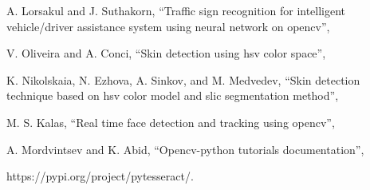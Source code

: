 \documentclass[uplatex, twocolumn,10pt]{jsarticle}
\begin{document}
\begin{thebibliography}{99}
    A. Lorsakul and J. Suthakorn,
    \newblock “Traffic sign recognition for intelligent vehicle/driver assistance system using neural network on opencv”,
    
    V. Oliveira and A. Conci,
    \newblock “Skin detection using hsv color space”,
    
    K. Nikolskaia, N. Ezhova, A. Sinkov, and M. Medvedev,
    \newblock “Skin detection technique based on hsv color model and slic segmentation method”,
    
    M. S. Kalas,
    \newblock “Real time face detection and tracking using opencv”,
    
    A. Mordvintsev and K. Abid,
    \newblock “Opencv-python tutorials documentation”,
    
    https://pypi.org/project/pytesseract/.
    
\end{thebibliography}
\end{document}
